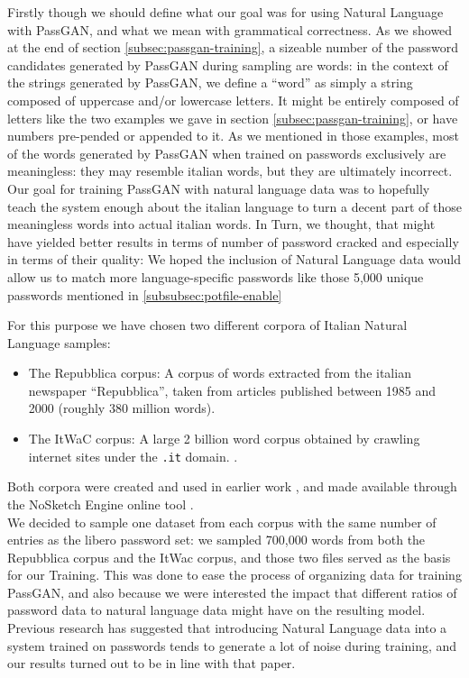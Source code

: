 Firstly though we should define what our goal was for using Natural Language with PassGAN, and what we mean with grammatical correctness. 
As we showed at the end of section \ref{subsec:passgan-training}, a sizeable number of the password candidates generated by PassGAN during sampling are words: in the context of the strings generated by PassGAN, we define a \enquote{word} as simply a string composed of uppercase and/or lowercase letters. It might be entirely composed of letters like the two examples we gave in section \ref{subsec:passgan-training}, or have numbers pre-pended or appended to it. As we mentioned in those examples, most of the words generated by PassGAN when trained on passwords exclusively are meaningless: they may resemble italian words, but they are ultimately incorrect.
Our goal for training PassGAN with natural language data was to hopefully teach the system enough about the italian language to turn a decent part of those meaningless words into actual italian words. In Turn, we thought, that might have yielded better results in terms of number of password cracked and especially in terms of their quality: We hoped the inclusion of Natural Language data would allow us to match more language-specific passwords like those 5,000 unique passwords mentioned in \ref{subsubsec:potfile-enable}   

For this purpose we have chosen two different corpora of Italian Natural Language samples: 
\begin{itemize}
    \item The Repubblica corpus: A corpus of words extracted from the italian newspaper \enquote{Repubblica}, taken from articles published between 1985 and 2000 (roughly 380 million words).\cite{repubblica_corpus}
    \item The ItWaC corpus: A large 2 billion word corpus obtained by crawling internet sites under the \texttt{.it} domain. \cite{itwac_corpus}.  
\end{itemize}

Both corpora were created and used in earlier work \cite{baroni2004introducing,baroni2009wacky}, and made available through the NoSketch Engine online tool \cite{nosketch_engine}.\\
We decided to sample one dataset from each corpus with the same number of entries as the libero password set: we sampled 700,000 words from both the Repubblica corpus and the ItWac corpus, and those two files served as the basis for our Training. This was done to ease the process of organizing data for training PassGAN, and also because we were interested the impact that different ratios of password data to natural language data might have on the resulting model.
Previous research \cite{Melicher2016} has suggested that introducing Natural Language data into a system trained on passwords tends to generate a lot of noise during training, and our results turned out to be in line with that paper.

